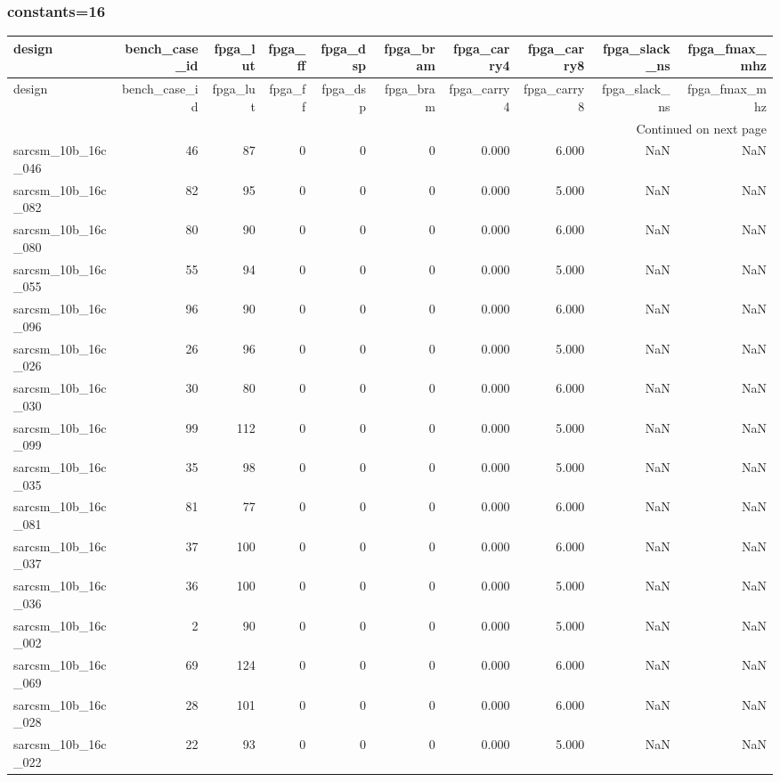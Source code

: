 \documentclass{article}
\begin{document}
\subsubsection*{constants=16}
\begin{longtable}{lrrrrrrrrr}
\toprule
design & bench\_case\_id & fpga\_lut & fpga\_ff & fpga\_dsp & fpga\_bram & fpga\_carry4 & fpga\_carry8 & fpga\_slack\_ns & fpga\_fmax\_mhz \\
\midrule
\endfirsthead
\toprule
design & bench\_case\_id & fpga\_lut & fpga\_ff & fpga\_dsp & fpga\_bram & fpga\_carry4 & fpga\_carry8 & fpga\_slack\_ns & fpga\_fmax\_mhz \\
\midrule
\endhead
\midrule
\multicolumn{10}{r}{Continued on next page} \\
\midrule
\endfoot
\bottomrule
\endlastfoot
sarcsm\_10b\_16c\_046 & 46 & 87 & 0 & 0 & 0 & 0.000 & 6.000 & NaN & NaN \\
sarcsm\_10b\_16c\_082 & 82 & 95 & 0 & 0 & 0 & 0.000 & 5.000 & NaN & NaN \\
sarcsm\_10b\_16c\_080 & 80 & 90 & 0 & 0 & 0 & 0.000 & 6.000 & NaN & NaN \\
sarcsm\_10b\_16c\_055 & 55 & 94 & 0 & 0 & 0 & 0.000 & 5.000 & NaN & NaN \\
sarcsm\_10b\_16c\_096 & 96 & 90 & 0 & 0 & 0 & 0.000 & 6.000 & NaN & NaN \\
sarcsm\_10b\_16c\_026 & 26 & 96 & 0 & 0 & 0 & 0.000 & 5.000 & NaN & NaN \\
sarcsm\_10b\_16c\_030 & 30 & 80 & 0 & 0 & 0 & 0.000 & 6.000 & NaN & NaN \\
sarcsm\_10b\_16c\_099 & 99 & 112 & 0 & 0 & 0 & 0.000 & 5.000 & NaN & NaN \\
sarcsm\_10b\_16c\_035 & 35 & 98 & 0 & 0 & 0 & 0.000 & 5.000 & NaN & NaN \\
sarcsm\_10b\_16c\_081 & 81 & 77 & 0 & 0 & 0 & 0.000 & 6.000 & NaN & NaN \\
sarcsm\_10b\_16c\_037 & 37 & 100 & 0 & 0 & 0 & 0.000 & 6.000 & NaN & NaN \\
sarcsm\_10b\_16c\_036 & 36 & 100 & 0 & 0 & 0 & 0.000 & 5.000 & NaN & NaN \\
sarcsm\_10b\_16c\_002 & 2 & 90 & 0 & 0 & 0 & 0.000 & 5.000 & NaN & NaN \\
sarcsm\_10b\_16c\_069 & 69 & 124 & 0 & 0 & 0 & 0.000 & 6.000 & NaN & NaN \\
sarcsm\_10b\_16c\_028 & 28 & 101 & 0 & 0 & 0 & 0.000 & 6.000 & NaN & NaN \\
sarcsm\_10b\_16c\_022 & 22 & 93 & 0 & 0 & 0 & 0.000 & 5.000 & NaN & NaN \\

\end{longtable}
\end{document}
